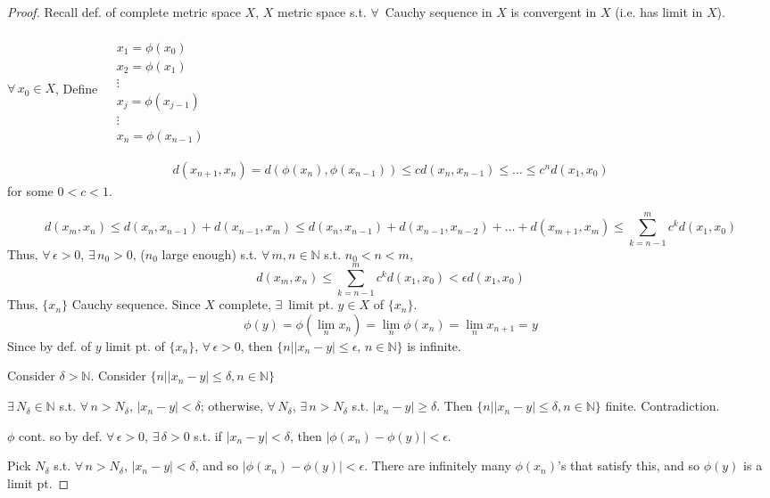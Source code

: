 \documentclass[10pt]{amsart}
\begin{document}
\begin{multicols*}{2}
\begin{proof}
  Recall def. of complete metric space $X$, $X$ metric space s.t. $\forall \, $ Cauchy sequence in $X$ is convergent in $X$ (i.e. has limit in $X$).  

$\forall \, x_0 \in X$,
Define $\begin{aligned} & \quad \\
  & x_1 = \phi(x_0) \\ 
  & x_2 = \phi(x_1) \\ 
  & \vdots \\
  & x_j = \phi(x_{j-1}) \\ 
  & \vdots \\
  & x_n = \phi(x_{n-1})
\end{aligned}$

\[
\begin{gathered}
  d(x_{n+1},x_n) = d(\phi(x_n),\phi(x_{n-1})) \leq c d(x_n,x_{n-1}) \leq \dots \leq c^nd(x_1,x_0)
\end{gathered}
\]
for some $0< c<1$.

\[
d(x_m,x_n) \leq d(x_n,x_{n-1}) + d(x_{n-1},x_m) \leq d(x_n,x_{n-1}) + d(x_{n-1},x_{n-2}) + \dots + d(x_{m+1},x_m) \leq \sum_{k=n-1}^m c^k d(x_1,x_0)
\]
Thus, $\forall \, \epsilon >0$, $\exists \, n_0 >0$, ($n_0$ large enough) s.t. $\forall \, m ,n\in \mathbb{N}$ s.t. $n_0 < n <m$, 
\[
d(x_m,x_n) \leq \sum_{k=n-1}^m c^k d(x_1,x_0) < \epsilon d(x_1,x_0)
\]
Thus, $\lbrace x_n \rbrace$ Cauchy sequence.  Since $X$ complete, $\exists \, $ limit pt. $y \in X$ of $\lbrace x_n \rbrace$.  
\[
\phi(y) = \phi(\lim_n x_n) = \lim_n \phi(x_n) = \lim_n x_{n+1} = y
\]
Since by def. of $y$ limit pt. of $\lbrace x_n \rbrace$, $\forall \, \epsilon >0$, then $\lbrace n | |x_n -y|\leq \epsilon, \, n \in \mathbb{N}\rbrace$ is infinite.  

Consider $\delta > \mathbb{N}$.  Consider $\lbrace n | |x_n-y| \leq \delta, n \in \mathbb{N}\rbrace$ 

$\exists \, N_{\delta} \in \mathbb{N}$ s.t. $\forall \, n > N_{\delta}$, $|x_n-y|< \delta$; otherwise, $\forall \, N_{\delta}$, $\exists \, n > N_{\delta}$ s.t. $|x_n - y| \geq \delta$.  Then $\lbrace n | |x_n -y| \leq \delta , n \in \mathbb{N} \rbrace$ finite.  Contradiction.  

$\phi$ cont. so by def. $\forall \, \epsilon >0$, $\exists \, \delta >0$ s.t. if $|x_n -y| < \delta$, then $|\phi(x_n) - \phi(y) | < \epsilon$.  

Pick $N_{\delta}$ s.t. $\forall \, n > N_{\delta}$, $|x_n-y| < \delta$, and so $|\phi(x_n) - \phi(y)|< \epsilon$. There are infinitely many $\phi(x_n)$'s that satisfy this, and so $\phi(y)$ is a limit pt.  


\end{proof}
\end{multicols*}
\end{document}
